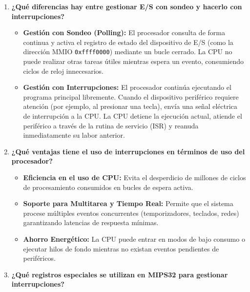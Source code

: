 \documentclass[12pt,letterpaper]{article}
\begin{document}
\begin{enumerate}
    \item \textbf{\large\color{UCBlue}¿Qué diferencias hay entre gestionar E/S con sondeo y hacerlo con interrupciones?}
    
    \vspace{0.2cm}
    \begin{itemize}
        \item \textbf{Gestión con Sondeo (Polling):} El procesador consulta de forma continua y activa el registro de estado del dispositivo de E/S (como la dirección MMIO \texttt{0xffff0000}) mediante un bucle cerrado. La CPU no puede realizar otras tareas útiles mientras espera un evento, consumiendo ciclos de reloj innecesarios.
        \item \textbf{Gestión con Interrupciones:} El procesador continúa ejecutando el programa principal libremente. Cuando el dispositivo periférico requiere atención (por ejemplo, al presionar una tecla), envía una señal eléctrica de interrupción a la CPU. La CPU detiene la ejecución actual, atiende el periférico a través de la rutina de servicio (ISR) y reanuda inmediatamente su labor anterior.
    \end{itemize}

    \item \textbf{\large\color{UCBlue}¿Qué ventajas tiene el uso de interrupciones en términos de uso del procesador?}
    
    \vspace{0.2cm}
    \begin{itemize}
        \item \textbf{Eficiencia en el uso de CPU:} Evita el desperdicio de millones de ciclos de procesamiento consumidos en bucles de espera activa.
        \item \textbf{Soporte para Multitarea y Tiempo Real:} Permite que el sistema procese múltiples eventos concurrentes (temporizadores, teclados, redes) garantizando latencias de respuesta mínimas.
        \item \textbf{Ahorro Energético:} La CPU puede entrar en modos de bajo consumo o ejecutar hilos de fondo mientras no existan eventos pendientes de periféricos.
    \end{itemize}

    \item \textbf{\large\color{UCBlue}¿Qué registros especiales se utilizan en MIPS32 para gestionar interrupciones?}
    

\end{enumerate}
\end{document}
